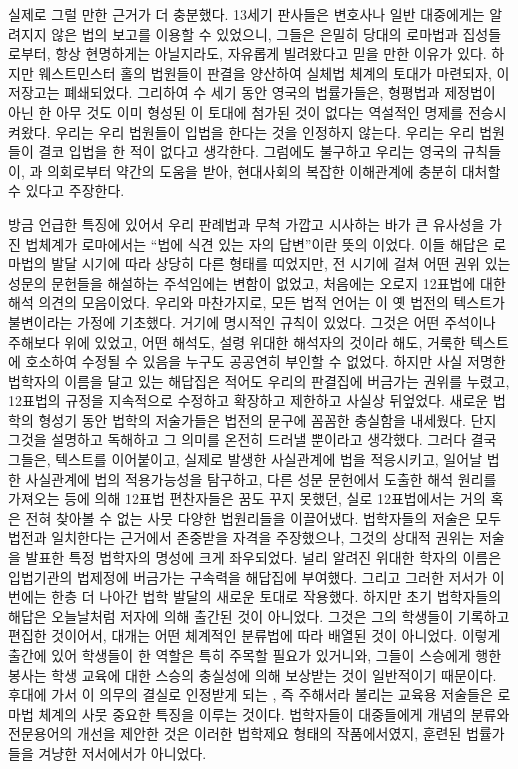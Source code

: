 실제로 그럴 만한 근거가 더 충분했다.
13세기 판사들은 변호사나 일반 대중에게는 알려지지 않은
법의 보고를 이용할 수 있었으니,
그들은 은밀히 당대의 로마법과  집성들로부터, 항상 현명하게는 아닐지라도,
자유롭게 빌려왔다고 믿을 만한 이유가 있다.
하지만 웨스트민스터 홀의 법원들이 판결을 양산하여 실체법 체계의 토대가 마련되자,
이 저장고는 폐쇄되었다.
그리하여 수 세기 동안 영국의 법률가들은, 형평법과 제정법이 아닌 한 아무 것도
이미 형성된 이 토대에 첨가된 것이 없다는 역설적인 명제를 전승시켜왔다.
우리는 우리 법원들이 입법을 한다는 것을 인정하지 않는다.
우리는 우리 법원들이 결코 입법을 한 적이 없다고 생각한다.
그럼에도 불구하고 우리는 영국의  규칙들이, 과
의회로부터 약간의 도움을 받아, 현대사회의 복잡한 이해관계에 충분히 대처할 수 있다고 주장한다.

방금 언급한 특징에 있어서 우리 판례법과 무척 가깝고 시사하는 바가 큰 유사성을 가진 법체계가
로마에서는 ``법에 식견 있는 자의 답변''이란 뜻의 이었다.
이들 해답은 로마법의 발달 시기에 따라 상당히 다른 형태를 띠었지만,
전 시기에 걸쳐 어떤 권위 있는 성문의 문헌들을 해설하는 주석임에는 변함이 없었고,
처음에는 오로지 12표법에 대한 해석 의견의 모음이었다.
우리와 마찬가지로, 모든 법적 언어는 이 옛 법전의 텍스트가 불변이라는 가정에 기초했다.
거기에 명시적인 규칙이 있었다.
그것은 어떤 주석이나 주해보다 위에 있었고, 어떤 해석도, 설령 위대한 해석자의 것이라 해도,
거룩한 텍스트에 호소하여 수정될 수 있음을 누구도 공공연히 부인할 수 없었다.
하지만 사실 저명한 법학자의 이름을 달고 있는 해답집은
적어도 우리의 판결집에 버금가는 권위를 누렸고,
12표법의 규정을 지속적으로 수정하고 확장하고 제한하고 사실상 뒤엎었다.
새로운 법학의 형성기 동안 법학의 저술가들은 법전의 문구에 꼼꼼한 충실함을 내세웠다.
단지 그것을 설명하고 독해하고 그 의미를 온전히 드러낼 뿐이라고 생각했다.
그러다 결국 그들은, 텍스트를 이어붙이고,
실제로 발생한 사실관계에 법을 적응시키고,
일어날 법한 사실관계에 법의 적용가능성을 탐구하고,
다른 성문 문헌에서 도출한 해석 원리를 가져오는 등에 의해
12표법 편찬자들은 꿈도 꾸지 못했던, 실로 12표법에서는 거의 혹은 전혀 찾아볼 수 없는
사뭇 다양한 법원리들을 이끌어냈다.
법학자들의 저술은 모두 법전과 일치한다는 근거에서 존중받을 자격을 주장했으나,
그것의 상대적 권위는 저술을 발표한 특정 법학자의 명성에 크게 좌우되었다.
널리 알려진 위대한 학자의 이름은 입법기관의 법제정에 버금가는 구속력을 해답집에 부여했다.
그리고 그러한 저서가 이번에는 한층 더 나아간 법학 발달의 새로운 토대로 작용했다.
하지만 초기 법학자들의 해답은 오늘날처럼 저자에 의해 출간된 것이 아니었다.
그것은 그의 학생들이 기록하고 편집한 것이어서,
대개는 어떤 체계적인 분류법에 따라 배열된 것이 아니었다.
이렇게 출간에 있어 학생들이 한 역할은 특히 주목할 필요가 있거니와,
그들이 스승에게 행한 봉사는 학생 교육에 대한 스승의 충실성에 의해 보상받는 것이 일반적이기 때문이다.
후대에 가서 이 의무의 결실로 인정받게 되는
, 즉
주해서라 불리는 교육용 저술들은
로마법 체계의 사뭇 중요한 특징을 이루는 것이다.
법학자들이 대중들에게 개념의 분류와 전문용어의 개선을 제안한 것은
이러한 법학제요 형태의 작품에서였지, 훈련된 법률가들을 겨냥한 저서에서가 아니었다.

